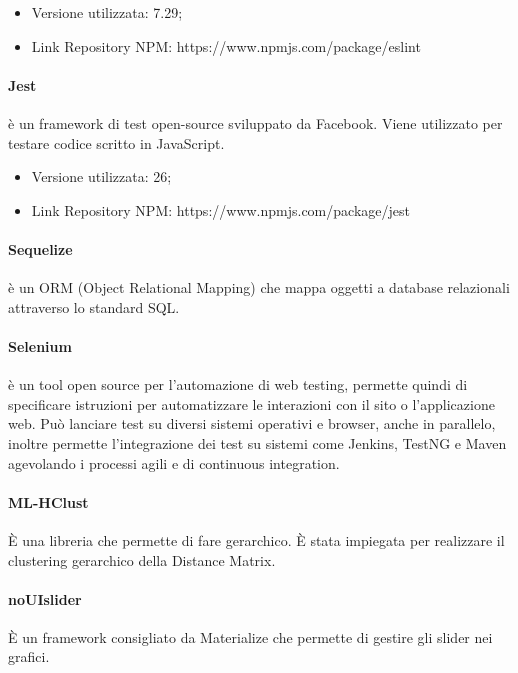 \documentclass[../manuale_sviluppatore.tex]{subfiles}
\begin{document}
\begin{itemize}
    \item Versione utilizzata: 7.29;
    \item Link Repository NPM: https://www.npmjs.com/package/eslint 
\end{itemize}

\paragraph{Jest}
 è un framework di test open-source sviluppato da Facebook. Viene utilizzato per testare codice scritto in JavaScript. 
\begin{itemize}
    \item Versione utilizzata: 26;
    \item Link Repository NPM: https://www.npmjs.com/package/jest 
\end{itemize}

\paragraph{Sequelize}
 è un ORM (Object Relational Mapping) che mappa oggetti a database relazionali attraverso lo standard SQL.

\paragraph{Selenium}
 è un tool open source per l'automazione di web testing, permette quindi di specificare istruzioni per automatizzare le interazioni con il sito o l’applicazione web. 
Può lanciare test su diversi sistemi operativi e browser, anche in parallelo, inoltre permette l’integrazione dei test su sistemi come Jenkins, TestNG e Maven agevolando i processi agili e di continuous integration.

\paragraph{ML-HClust}
È una libreria che permette di fare  gerarchico. È stata impiegata per realizzare il clustering gerarchico della Distance Matrix.

\paragraph{noUIslider}
È un framework consigliato da Materialize che permette di gestire gli slider nei grafici. 
\end{document}
